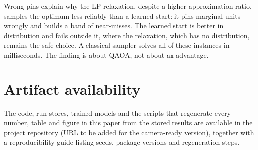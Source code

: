 Wrong pins explain why the LP relaxation, despite a higher approximation ratio, samples the optimum less reliably than a learned start: it pins marginal units wrongly and builds a band of near-misses. The learned start is better in distribution and fails outside it, where the relaxation, which has no distribution, remains the safe choice. A classical sampler solves all of these instances in milliseconds. The finding is about QAOA, not about an advantage.

\section*{Artifact availability}
The code, run stores, trained models and the scripts that regenerate every number, table and figure in this paper from the stored results are available in the project repository (URL to be added for the camera-ready version), together with a reproducibility guide listing seeds, package versions and regeneration steps.
